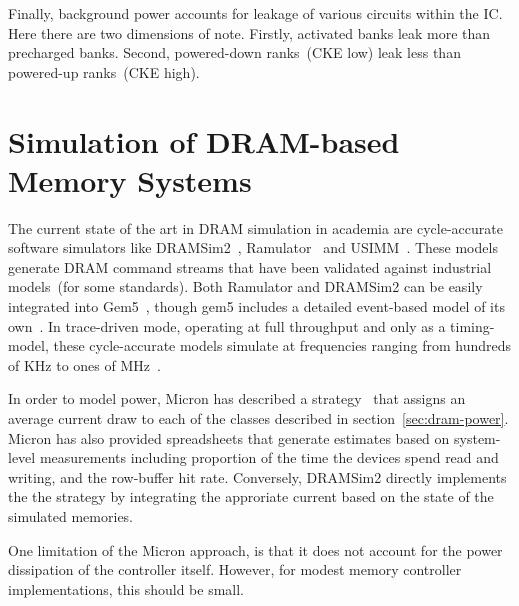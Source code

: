 Finally, background power accounts for leakage of various circuits within the
IC. Here there are two dimensions of note. Firstly, activated banks
leak more than precharged banks. Second, powered-down ranks~(CKE low) leak less
than powered-up ranks~(CKE high).


\section{Simulation of DRAM-based Memory Systems}

The current state of the art in DRAM simulation in academia are cycle-accurate
software simulators like DRAMSim2~\cite{dramsim}, Ramulator~\cite{ramulator} and
USIMM~\cite{usimm}. These models generate DRAM command streams that have been
validated against industrial models~(for some standards). Both Ramulator and
DRAMSim2 can be easily integrated into Gem5~\cite{gem5}, though gem5 includes a
detailed event-based model of its own~\cite{gem5event}. In trace-driven mode,
operating at full throughput and only as a timing-model, these cycle-accurate
models simulate at frequencies ranging from hundreds of KHz to ones of
MHz~\cite{ramulator}.

In order to model power, Micron has described a strategy~\cite{micronpower}
that assigns an average current draw to each of the classes described in
section~\ref{sec:dram-power}. Micron has also provided spreadsheets that
generate estimates based on system-level measurements including proportion of
the time the devices spend read and writing, and the row-buffer hit rate.
Conversely, DRAMSim2 directly implements the the strategy by integrating the
approriate current based on the state of the simulated memories.

One limitation of the Micron approach, is that it does not account for the
power dissipation of the controller itself. However, for modest memory
controller implementations, this should be small.
